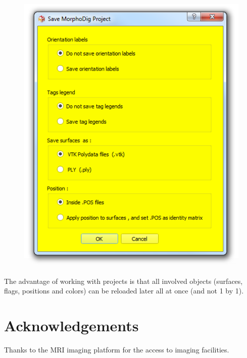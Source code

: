 \documentclass[12pt, a4paper]{book}
\begin{document}
\begin{figure}
  \centering  
 \includegraphics[scale=0.5]{../images/07/project/save_ntw.png}
\label{save_project_file}
\end{figure}

The advantage of working with projects is that all involved objects (surfaces, flags, positions and colors) can be reloaded later all at once (and not 1 by 1). 

\section{Acknowledgements}
Thanks to the MRI imaging platform for the access to imaging facilities.



%  		
\end{document}
